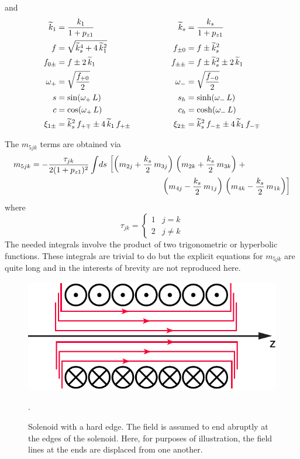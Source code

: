 and
\begin{alignat}{2}
  \widetilde k_1        &= \frac{k_1}{1 + p_{z1}} & \qquad \qquad 
  \widetilde k_s          &= \frac{k_s}{1 + p_{z1}} \nonumber \\
  f            &= \sqrt{\widetilde k_s^4 + 4 \, \widetilde k_1^2} & \qquad \qquad
  f_{\pm0}     &= f \pm \widetilde k_s^2 \nonumber \\
  f_{0\pm}     &= f \pm 2 \, \widetilde k_1 & \qquad \qquad
  f_{\pm\pm}   &= f \pm \widetilde k_s^2 \pm 2 \, \widetilde k_1 \nonumber \\
  \omega_+        &= \sqrt{\frac{f_{+0}}{2}} & \qquad \qquad
  \omega_-        &= \sqrt{\frac{f_{-0}}{2}} \\
  s            &= \sin (\omega_+ \, L) & \qquad \qquad
  s_h          &= \sinh (\omega_- \, L) \nonumber \\
  c            &= \cos (\omega_+ \, L) & \qquad \qquad
  c_h          &= \cosh (\omega_- \, L) \nonumber \\
  \xi_{1\pm} &= \widetilde k_s^2 \, f_{+\mp} \pm 4 \, \widetilde k_1 \, f_{+\pm} & \qquad \qquad
  \xi_{2\pm} &= \widetilde k_s^2 \, f_{-\pm} \pm 4 \, \widetilde k_1 \, f_{-\mp} \nonumber
\end{alignat}

The $m_{5jk}$ terms are obtained via 
\begin{align}
  m_{5jk} = - \frac{\tau_{jk}}{2 (1 + p_{z1})^2} \int \! ds \, 
  & \left[ 
    \left( m_{2j} + \frac{k_s}{2} \, m_{3j} \right) \, 
    \left( m_{2k} + \frac{k_s}{2} \, m_{3k} \right)   
  \right. + \\
  & \hspace*{15ex} \left.
    \left( m_{4j} - \frac{k_s}{2} \, m_{1j} \right) \, 
    \left( m_{4k} - \frac{k_s}{2} \, m_{1k} \right) 
  \right] \nonumber
\end{align}
where
\begin{equation}
  \tau_{jk} = 
  \begin{cases}
    1 & j = k \\
    2 & j \ne k 
  \end{cases}
\end{equation}
The needed integrals involve the product of two trigonometric or
hyperbolic functions. These integrals are trivial to do but the
explicit equations for $m_{5jk}$ are quite long and in the interests of
brevity are not reproduced here.


\begin{figure}[tb]
  \centering
  \includegraphics[width=5in]{solenoid.pdf}
  \caption[Solenoid with a hard edge.]
  {
Solenoid with a hard edge. The field is assumed to end abruptly at the
edges of the solenoid. Here, for purposes of illustration, the field lines at
the ends are displaced from one another.
  }
  \label{f:solenoid}.
\end{figure}

